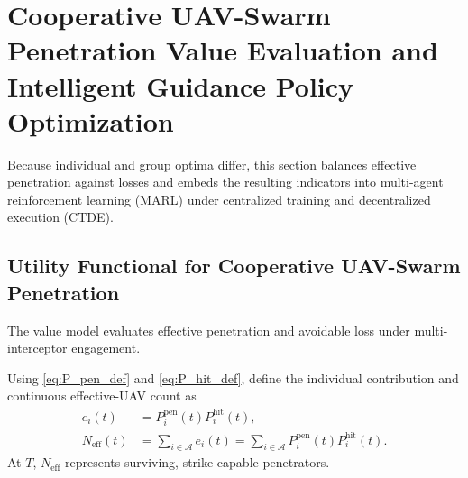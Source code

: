 \documentclass{cja}
\begin{document}
\section{Cooperative UAV-Swarm Penetration Value Evaluation and Intelligent Guidance Policy Optimization}

Because individual and group optima differ, this section balances effective penetration against losses and embeds the resulting indicators into multi-agent reinforcement learning (MARL) under centralized training and decentralized execution (CTDE).

\subsection{Utility Functional for Cooperative UAV-Swarm Penetration}

The value model evaluates effective penetration and avoidable loss under multi-interceptor engagement.

Using \eqref{eq:P_pen_def} and \eqref{eq:P_hit_def}, define the individual contribution and continuous effective-UAV count as
\begin{equation}
\begin{aligned}
e_i(t)
&=P_i^{\mathrm{pen}}(t)P_i^{\mathrm{hit}}(t),\\
N_{\mathrm{eff}}(t)
&=\sum_{i\in\mathcal A}e_i(t)
=\sum_{i\in\mathcal A}P_i^{\mathrm{pen}}(t)P_i^{\mathrm{hit}}(t).
\end{aligned}
\end{equation}
At $T$, $N_{\mathrm{eff}}$ represents surviving, strike-capable penetrators.
\end{document}
